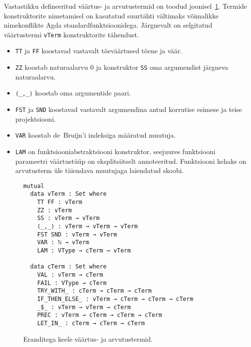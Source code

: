 \documentclass[a4paper,12pt]{article}
\begin{document}
Vastastikku defineeritud väärtus- ja arvutustermid on toodud joonisel~\ref{fig:exc.raw}.
Termide konstruktorite nimetamisel on kasutatud suurtähti vältimaks võimalikke nimekonflikte Agda standardfunktsioonidega.
Järgnevalt on selgitatud väärtustermi {\tt vTerm} konstruktorite tähendust.
\begin{itemize}
\item {\tt TT} ja {\tt FF} koostavad vastavalt tõeväärtused tõene ja väär.
\item {\tt ZZ} koostab naturaalarvu 0 ja konstruktor {\tt SS} oma argumendist järgneva naturaalarvu.
\item {\tt ⟨_,_⟩} koostab oma argumentide paari.
\item {\tt FST} ja {\tt SND} koostavad vastavalt argumendina antud korrutise esimese ja teise projektsiooni.
\item {\tt VAR} koostab de~Bruijn'i indeksiga määratud muutuja.
\item {\tt LAM} on funktsiooniabstraktsiooni konstruktor, seejuures funktsiooni parameetri väärtustüüp on eksplitsiitselt annoteeritud. Funktsiooni kehaks on arvutusterm üle täiendava muutujaga laiendatud skoobi.
\end{itemize}
\begin{figure}
  \begin{BVerbatim}
mutual
  data vTerm : Set where
    TT FF : vTerm
    ZZ : vTerm
    SS : vTerm → vTerm
    ⟨_,_⟩ : vTerm → vTerm → vTerm
    FST SND : vTerm → vTerm
    VAR : ℕ → vTerm
    LAM : VType → cTerm → vTerm

  data cTerm : Set where
    VAL : vTerm → cTerm
    FAIL : VType → cTerm
    TRY_WITH_ : cTerm → cTerm → cTerm
    IF_THEN_ELSE_ : vTerm → cTerm → cTerm → cTerm
    _$_ : vTerm → vTerm → cTerm
    PREC : vTerm → cTerm → cTerm → cTerm
    LET_IN_ : cTerm → cTerm → cTerm
  \end{BVerbatim}
  \caption{Eranditega keele väärtus- ja arvutustermid.}
  \label{fig:exc.raw}
\end{figure}
\end{document}
